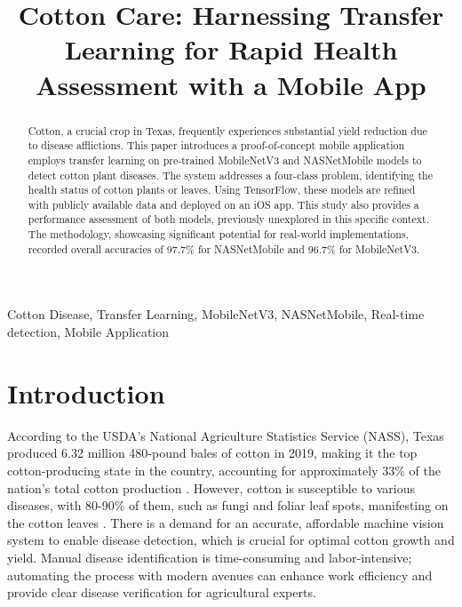 \documentclass[conference]{IEEEtran}
\begin{document}
\title{Cotton Care: Harnessing Transfer Learning for Rapid Health Assessment with a Mobile App\\}



\makeatletter
\newcommand{\linebreakand}{%
  \end{@IEEEauthorhalign}
  \hfill\mbox{}\par
  \mbox{}\hfill\begin{@IEEEauthorhalign}
}
\makeatother


\author{
}



\maketitle

\begin{abstract}
Cotton, a crucial crop in Texas, frequently experiences substantial yield reduction due to disease afflictions. This paper introduces a proof-of-concept mobile application employs transfer learning on pre-trained MobileNetV3 and NASNetMobile models to detect cotton plant diseases. The system addresses a four-class problem, identifying the health status of cotton plants or leaves. Using TensorFlow, these models are refined with publicly available data and deployed on an iOS app. This study also provides a performance assessment of both models, previously unexplored in this specific context. The methodology, showcasing significant potential for real-world implementations, recorded overall accuracies of 97.7\% for NASNetMobile and 96.7\% for MobileNetV3.
\end{abstract}

\begin{IEEEkeywords}
 Cotton Disease, Transfer Learning, MobileNetV3, NASNetMobile, Real-time detection, Mobile Application
\end{IEEEkeywords}

\section{Introduction}
According to the USDA's National Agriculture Statistics Service (NASS), Texas produced 6.32 million 480-pound bales of cotton in 2019, making it the top cotton-producing state in the country, accounting for approximately 33\% of the nation's total cotton production \cite{ USDA-NASS}. However, cotton is susceptible to various diseases, with 80-90\% of them, such as fungi and foliar leaf spots, manifesting on the cotton leaves \cite{Gulhane-Gurjar}. There is a demand for an accurate, affordable machine vision system to enable disease detection, which is crucial for optimal cotton growth and yield. Manual disease identification is time-consuming and labor-intensive; automating the process with modern avenues can enhance work efficiency and provide clear disease verification for agricultural experts.
\end{document}
